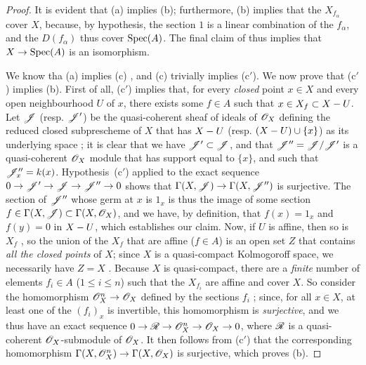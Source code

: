 \begin{proof}
It is evident that (a) implies (b); furthermore, (b) implies that the $X_{f_\alpha}$ cover $X$, because, by hypothesis, the section $1$ is a linear combination of the $f_\alpha$, and the $D(f_\alpha)$ thus cover $\operatorname{Spec}(A)$.
The final claim of  thus implies that $X\to\Spec(A)$ is an isomorphism.

We know tha (a) implies (c) , and (c) trivially implies (c$'$).
We now prove that (c$'$) implies (b).
First of all, (c$'$) implies that, for every \emph{closed} point $x\in X$ and every open neighbourhood $U$ of $x$, there exists some $f\in A$ such that $x\in X_f\subset X- U$.
Let $\mathscr{J}$ (resp. $\mathscr{J}'$) be the quasi-coherent sheaf of ideals of $\mathscr{O}_X$ defining the reduced closed subprescheme of $X$ that has $X- U$ (resp. $(X- U)\cup\{x\}$) as its underlying space ;
it is clear that we have $\mathscr{J}'\subset\mathscr{J}$, and that $\mathscr{J}''=\mathscr{J}/\mathscr{J}'$ is a quasi-coherent $\mathscr{O}_X$ module that has support equal to $\{x\}$, and such that $\mathscr{J}_x''=k(x)$.
Hypothesis~(c$'$) applied to the exact sequence $0\to\sh{J}'\to\sh{J}\to\sh{J}''\to0$ shows that $\Gamma(X,\sh{J})\to\Gamma(X,\sh{J}'')$ is surjective.
The section of $\mathscr{J}''$ whose germ at $x$ is $1_x$ is thus the image of some section $f\in\Gamma(X,\mathscr{J})\subset\Gamma(X,\mathscr{O}_X)$, and we have, by definition, that $f(x)=1_x$ and $f(y)=0$ in $X- U$, which establishes our claim.
Now, if $U$ is affine, then so is $X_f$ , so the union of the $X_f$ that are affine ($f\in A$) is an open set $Z$ that contains \emph{all the closed points} of $X$;
since $X$ is a quasi-compact Kolmogoroff space, we necessarily have $Z=X$ .
Because $X$ is quasi-compact, there are a \emph{finite} number of elements $f_i\in A$ ($1\leq i\leq n$) such that the $X_{f_i}$ are affine and cover $X$.
So consider the homomorphism $\sh{O}_X^n\to\sh{O}_X$ defined by the sections $f_i$ ;
since, for all $x\in X$, at least one of the $(f_i)_x$ is invertible, this homomorphism is \emph{surjective}, and we thus have an exact sequence $0\to\sh{R}\to\sh{O}_X^n\to\sh{O}_X\to0$, where $\mathscr{R}$ is a quasi-coherent $\mathscr{O}_X$-submodule of $\mathscr{O}_X$.
It then follows
from (c$'$) that the corresponding homomorphism $\Gamma(X,\sh{O}_X^n)\to\Gamma(X,\sh{O}_X)$ is surjective, which proves (b).


\end{proof}
